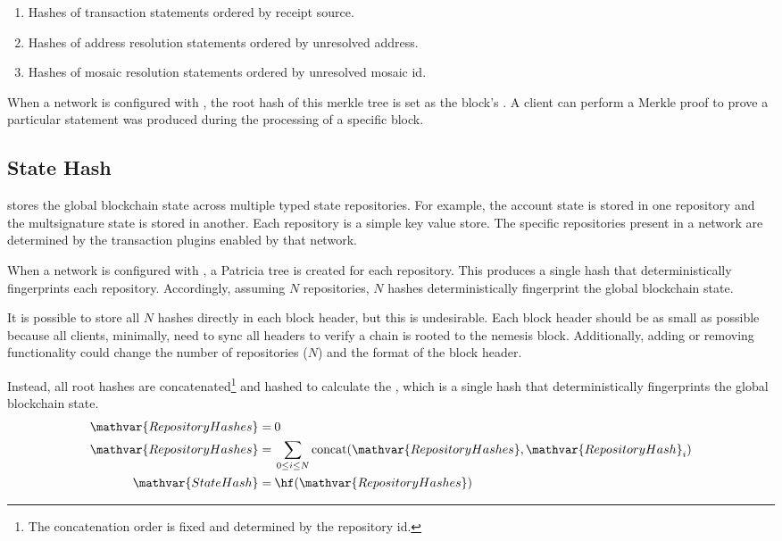 \begin{enumerate}
	\item{Hashes of transaction statements ordered by receipt source.}
	\item{Hashes of address resolution statements ordered by unresolved address.}
	\item{Hashes of mosaic resolution statements ordered by unresolved mosaic id.}
\end{enumerate}

When a network is configured with , the root hash of this merkle tree is set as the block's .
A client can perform a Merkle proof to prove a particular statement was produced during the processing of a specific block.

\subsection{State Hash}
\label{sec:blocks:statehash}

\codenamespace stores the global blockchain state across multiple typed state repositories.
For example, the account state is stored in one repository and the multsignature state is stored in another.
Each repository is a simple key value store.
The specific repositories present in a network are determined by the transaction plugins enabled by that network.

When a network is configured with , a Patricia tree is created for each repository.
This produces a single hash that deterministically fingerprints each repository.
Accordingly, assuming $N$ repositories, $N$ hashes deterministically fingerprint the global blockchain state.

It is possible to store all $N$ hashes directly in each block header, but this is undesirable.
Each block header should be as small as possible because all clients, minimally, need to sync all headers to verify a chain is rooted to the nemesis block.
Additionally, adding or removing functionality could change the number of repositories ($N$) and the format of the block header.

Instead, all root hashes are concatenated\footnote{The concatenation order is fixed and determined by the repository id.} and hashed to calculate the ,
which is a single hash that deterministically fingerprints the global blockchain state.
\begin{align*}
	\mathvar{RepositoryHashes} = \: & 0 \\
	\mathvar{RepositoryHashes} = \: & \sum_{0\leq i \leq N} \mathfunc{concat}(\mathvar{RepositoryHashes}, \mathvar{RepositoryHash}_i) \\
	\mathvar{StateHash} = \: & \hf(\mathvar{RepositoryHashes})
\end{align*}


